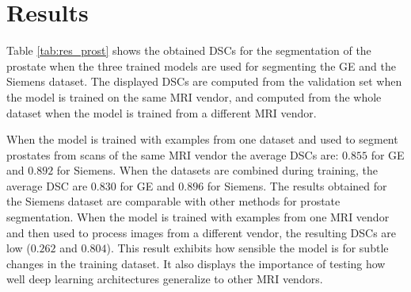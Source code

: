 \section{Results}

Table \ref{tab:res_prost} shows the obtained DSCs for the segmentation of the prostate when the three trained models are used for segmenting the GE and the Siemens dataset. The displayed DSCs are computed from the validation set when the model is trained on the same MRI vendor, and computed from the whole dataset when the model is trained from a different MRI vendor. 

When the model is trained with examples from one dataset and used to segment prostates from scans of the same MRI vendor the average DSCs are: $0.855$ for GE and $0.892$ for Siemens. When the datasets are combined during training, the average DSC are $0.830$ for GE and $0.896$ for Siemens.  The results obtained for the Siemens dataset are comparable with other methods for prostate segmentation. When the model is trained with examples from one MRI vendor and then used to process images from a different vendor, the resulting DSCs are low ($0.262$ and $0.804$).  This result exhibits how sensible the model is for subtle changes in the training dataset. It also displays the importance of testing how well deep learning architectures generalize to other MRI vendors.  

